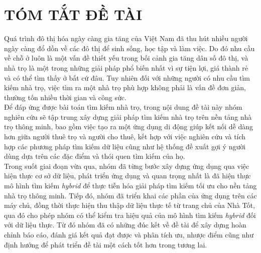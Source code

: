\chapter*{TÓM TẮT ĐỀ TÀI}
\hspace*{1cm} Quá trình đô thị hóa ngày càng gia tăng của Việt Nam đã thu hút nhiều người ngày càng đổ dồn về các đô thị để sinh sống, học tập và làm việc. Do đó nhu cầu về chỗ ở luôn là một vấn đề thiết yếu trong bối cảnh gia tăng dân số đô thị, và nhà trọ là một trong những giải pháp phổ biến nhất vì sự tiện lợi, giá thành rẻ và có thể tìm thấy ở bất cứ đâu. Tuy nhiên đối với những người có nhu cầu tìm kiếm nhà trọ, việc tìm ra một nhà trọ phù hợp không phải là vấn đề đơn giản, thường tốn nhiều thời gian và công sức.\\
\hspace*{1cm} Để đáp ứng được bài toán tìm kiếm nhà trọ, trong nội dung đề tài này nhóm nghiên cứu sẽ tập trung xây dựng giải pháp tìm kiếm nhà trọ trên nền tảng nhà trọ thông minh, bao gồm việc tạo ra một ứng dụng di động giúp kết nối dễ dàng hơn giữa người thuê trọ và người cho thuê, kết hợp với việc nghiên cứu và tích hợp các phương pháp tìm kiếm dữ liệu cũng như hệ thống đề xuất gợi ý người dùng dựa trên các đặc điểm và thói quen tìm kiếm của họ.\\
\hspace*{1cm} Trong suốt giai đoạn vừa qua, nhóm đã từng bước xây dựng ứng dụng qua việc hiện thực cơ sở dữ liệu, phát triển ứng dụng và quan trọng nhất là đã hiện thực mô hình tìm kiếm \textit{hybrid} để thực tiễn hóa giải pháp tìm kiếm tối ưu cho nền tảng nhà trọ thông minh. Tiếp đó, nhóm đã triển khai các phần của ứng dụng trên các máy chủ, đồng thời thực hiện thu thập dữ liệu thực tế từ trang chủ của Nhà Tốt, qua đó cho phép nhóm có thể kiểm tra hiệu quả của mô hình tìm kiếm \textit{hybrid} đối với dữ liệu thực. Từ đó nhóm đã có những đúc kết về đề tài để xây dựng hoàn chỉnh báo cáo, đánh giá kết quả đạt được và phân tích ưu, nhược điểm cũng như định hướng để phát triển đề tài một cách tốt hơn trong tương lai.
